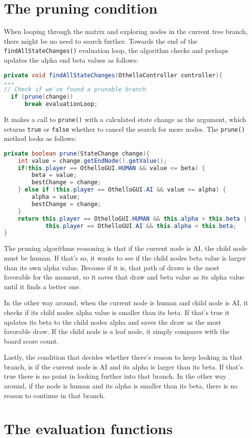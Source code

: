 \documentclass{article}
\begin{document}
\section{The pruning condition}
When looping through the matrix and exploring nodes in the current tree branch, there might be no need to
search further. Towards the end of the \verb|findAllStateChanges()| evaluation loop, the algorithm checks
and perhaps updates the alpha end beta values as follows:

\begin{lstlisting}[language=Java]
private void findAllStateChanges(OthelloController controller){
...
// Check if we've found a prunable branch
  if (prune(change))
      break evaluationLoop;
\end{lstlisting}

It makes a call to \verb|prune()| with a calculated state change as the argument,
which returns \verb|true| or \verb|false| whether to cancel the search for more nodes.
The \verb|prune()| method looks as follows:

\newpage
\begin{lstlisting}[language=Java]
private boolean prune(StateChange change){
    int value = change.getEndNode().getValue();
    if(this.player == OthelloGUI.HUMAN && value <= beta) {
        beta = value;
        bestChange = change;
    } else if (this.player == OthelloGUI.AI && value >= alpha) {
        alpha = value;
        bestChange = change;
    }
    return this.player == OthelloGUI.HUMAN && this.alpha > this.beta ||
            this.player == OthelloGUI.AI && this.alpha < this.beta;
}
\end{lstlisting}

The pruning algorithms reasoning is that if the current node is AI, the child node
must be human. If that's so, it wants to see if the child nodes beta value is larger
than its own alpha value. Because if it is, that path of draws is the most favorable
for the moment, so it saves that draw and beta value as its alpha value until it finds a better one.

In the other way around, when the current node is human and child node is AI, it
checks if its child nodes alpha value is smaller than its beta.
If that's true it updates its beta to the child nodes alpha and saves the draw
as the most favorable draw. If the child node is a leaf node, it simply compares with the board score count.

Lastly, the condition that decides whether there's reason to keep looking in that branch,
is if the current node is AI and its alpha is larger than its beta. If that's true there is
no point in looking further into that branch.
In the other way around, if the node is human and its alpha is smaller than its beta, there is
no reason to continue in that branch.



\section{The evaluation functions}
\end{document}

